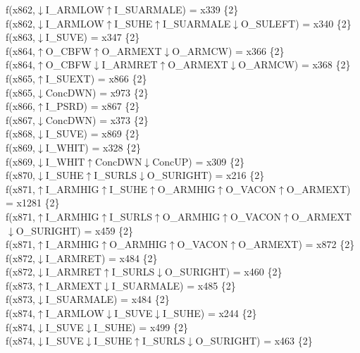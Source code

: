f(x862,$\downarrow$I\_ARMLOW$\uparrow$I\_SUARMALE) = x339 \{2\} \\  
f(x862,$\downarrow$I\_ARMLOW$\uparrow$I\_SUHE$\uparrow$I\_SUARMALE$\downarrow$O\_SULEFT) = x340 \{2\} \\  
f(x863,$\downarrow$I\_SUVE) = x347 \{2\} \\  
f(x864,$\uparrow$O\_CBFW$\uparrow$O\_ARMEXT$\downarrow$O\_ARMCW) = x366 \{2\} \\  
f(x864,$\uparrow$O\_CBFW$\downarrow$I\_ARMRET$\uparrow$O\_ARMEXT$\downarrow$O\_ARMCW) = x368 \{2\} \\  
f(x865,$\uparrow$I\_SUEXT) = x866 \{2\} \\  
f(x865,$\downarrow$ConcDWN) = x973 \{2\} \\  
f(x866,$\uparrow$I\_PSRD) = x867 \{2\} \\  
f(x867,$\downarrow$ConcDWN) = x373 \{2\} \\  
f(x868,$\downarrow$I\_SUVE) = x869 \{2\} \\  
f(x869,$\downarrow$I\_WHIT) = x328 \{2\} \\  
f(x869,$\downarrow$I\_WHIT$\uparrow$ConcDWN$\downarrow$ConcUP) = x309 \{2\} \\  
f(x870,$\downarrow$I\_SUHE$\uparrow$I\_SURLS$\downarrow$O\_SURIGHT) = x216 \{2\} \\  
f(x871,$\uparrow$I\_ARMHIG$\uparrow$I\_SUHE$\uparrow$O\_ARMHIG$\uparrow$O\_VACON$\uparrow$O\_ARMEXT) = x1281 \{2\} \\  
f(x871,$\uparrow$I\_ARMHIG$\uparrow$I\_SURLS$\uparrow$O\_ARMHIG$\uparrow$O\_VACON$\uparrow$O\_ARMEXT$\downarrow$O\_SURIGHT) = x459 \{2\} \\  
f(x871,$\uparrow$I\_ARMHIG$\uparrow$O\_ARMHIG$\uparrow$O\_VACON$\uparrow$O\_ARMEXT) = x872 \{2\} \\  
f(x872,$\downarrow$I\_ARMRET) = x484 \{2\} \\  
f(x872,$\downarrow$I\_ARMRET$\uparrow$I\_SURLS$\downarrow$O\_SURIGHT) = x460 \{2\} \\  
f(x873,$\uparrow$I\_ARMEXT$\downarrow$I\_SUARMALE) = x485 \{2\} \\  
f(x873,$\downarrow$I\_SUARMALE) = x484 \{2\} \\  
f(x874,$\uparrow$I\_ARMLOW$\downarrow$I\_SUVE$\downarrow$I\_SUHE) = x244 \{2\} \\  
f(x874,$\downarrow$I\_SUVE$\downarrow$I\_SUHE) = x499 \{2\} \\  
f(x874,$\downarrow$I\_SUVE$\downarrow$I\_SUHE$\uparrow$I\_SURLS$\downarrow$O\_SURIGHT) = x463 \{2\} \\  

